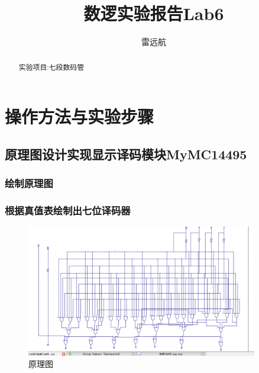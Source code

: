 \documentclass{article}
\title{数逻实验报告Lab6}
\author{雷远航}
\begin{document}
\maketitle

\begin{abstract}
    实验项目:七段数码管
\end{abstract}

\section{操作方法与实验步骤}

\subsection{原理图设计实现显示译码模块MyMC14495}
\subsubsection{绘制原理图}
\subsubsection*{根据真值表绘制出七位译码器}
    \begin{figure}[H]
	\centering
	\includegraphics[width=0.9\textwidth]{1.png}
	\caption{\label{Lab6}原理图}
	\end{figure}
\end{document}
